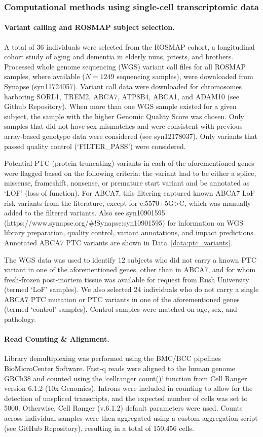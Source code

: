 \subsubsection{Computational methods using single-cell transcriptomic data}

\paragraph{Variant calling and ROSMAP subject selection.}
A total of 36 individuals were selected from the ROSMAP cohort, a longitudinal cohort study of aging and dementia in elderly nuns, priests, and brothers. Processed whole genome sequencing (WGS) variant call files for all ROSMAP samples, where available ($N=1249$ sequencing samples), were downloaded from Synapse (syn11724057). Variant call data were downloaded for chromosomes harboring SORL1, TREM2, ABCA7, ATP8B4, ABCA1, and ADAM10 (see Github Repository). When more than one WGS sample existed for a given subject, the sample with the higher Genomic Quality Score was chosen. Only samples that did not have sex mismatches and were consistent with previous array-based genotype data were considered (see syn12178037). Only variants that passed quality control (‘FILTER_PASS’) were considered.

Potential PTC (protein-truncating) variants in each of the aforementioned genes were flagged based on the following criteria: the variant had to be either a splice, missense, frameshift, nonsense, or premature start variant and be annotated as ‘LOF’ (loss of function). For ABCA7, this filtering captured known ABCA7 LoF risk variants from the literature, except for c.5570+5G>C, which was manually added to the filtered variants. Also see syn10901595 (https://www.synapse.org/#!Synapse:syn10901595) for information on WGS library preparation, quality control, variant annotations, and impact predictions. Annotated ABCA7 PTC variants are shown in Data~\ref{data:ptc_variants}.

The WGS data was used to identify 12 subjects who did not carry a known PTC variant in one of the aforementioned genes, other than in ABCA7, and for whom fresh-frozen post-mortem tissue was available for request from Rush University (termed ‘LoF’ samples). We also selected 24 individuals who do not carry a single ABCA7 PTC mutation or PTC variants in one of the aforementioned genes (termed ‘control’ samples). Control samples were matched on age, sex, and pathology. 

\paragraph{Read Counting & Alignment.}
Library demultiplexing was performed using the BMC/BCC pipelines BioMicroCenter Software. Fast-q reads were aligned to the human genome GRCh38 and counted using the `cellranger count()` function from Cell Ranger version 6.1.2 (10x Genomics). Introns were included in counting to allow for the detection of unspliced transcripts, and the expected number of cells was set to 5000. Otherwise, Cell Ranger (v.6.1.2) default parameters were used. Counts across individual samples were then aggregated using a custom aggregation script (see GitHub Repository), resulting in a total of 150,456 cells.

